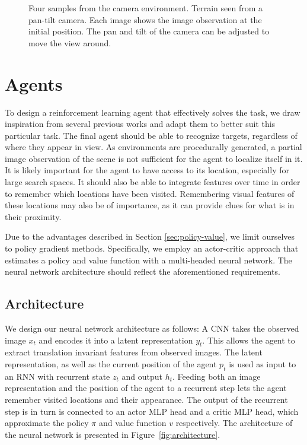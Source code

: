 \begin{figure}
    \centering
    
    \caption[Camera environment]{Four samples from the camera environment. Terrain seen from a pan-tilt camera. Each image shows the image observation at the initial position. The pan and tilt of the camera can be adjusted to move the view around.}
    \label{fig:camera}
\end{figure}

\section{Agents}
\label{sec:agents}

To design a reinforcement learning agent that effectively solves the task, we draw inspiration from several previous works and adapt them to better suit this particular task.
The final agent should be able to recognize targets, regardless of where they appear in view.
As environments are procedurally generated, a partial image observation of the scene is not sufficient for the agent to localize itself in it.
It is likely important for the agent to have access to its location, especially for large search spaces.
It should also be able to integrate features over time in order to remember which locations have been visited.
Remembering visual features of these locations may also be of importance, as it can provide clues for what is in their proximity.

Due to the advantages described in Section \ref{sec:policy-value}, we limit ourselves to policy gradient methods.
Specifically, we employ an actor-critic approach that estimates a policy and value function with a multi-headed neural network.
The neural network architecture should reflect the aforementioned requirements.

\subsection{Architecture}

We design our neural network architecture as follows:
A CNN takes the observed image \(x_t\) and encodes it into a latent representation \(y_t\).
This allows the agent to extract translation invariant features from observed images.
The latent representation, as well as the current position of the agent \(p_t\) is used as input to an RNN with recurrent state \(z_t\) and output \(h_t\).
Feeding both an image representation and the position of the agent to a recurrent step lets the agent remember visited locations and their appearance.
The output of the recurrent step is in turn is connected to an actor MLP head and a critic MLP head, which approximate the policy \(\pi\) and value function \(v\) respectively.
The architecture of the neural network is presented in Figure~\ref{fig:architecture}.

